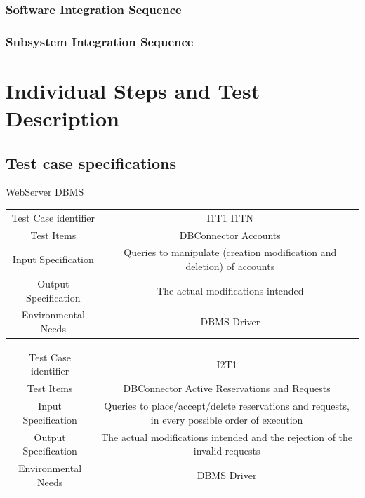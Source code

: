 \documentclass{article}
\begin{document}
\subsubsection{Software Integration Sequence}
\subsubsection{Subsystem Integration Sequence}
\section{Individual Steps and Test Description}
\subsection{Test case specifications}
	WebServer \rightarrow DBMS
	\begin{tabular}{*{2}{c}}
		\toprule
		Test Case identifier & I1T1 \rightarrow I1TN\\
		Test Items & DBConnector \rightarrow Accounts \\
		Input Specification & Queries to manipulate (creation modification and deletion) of accounts\\
		Output Specification & The actual modifications intended\\
		Environmental Needs & DBMS Driver\\
		\bottomrule
	\end{tabular}
	\begin{tabular}{*{2}{c}}
		\toprule
		Test Case identifier & I2T1\\
		Test Items & DBConnector \rightarrow Active Reservations and Requests \\
		Input Specification & Queries to place/accept/delete reservations and requests, in every possible order of execution\\
		Output Specification & The actual modifications intended and the rejection of the invalid requests\\
		Environmental Needs & DBMS Driver\\
		\bottomrule
	\end{tabular}
\end{document}
